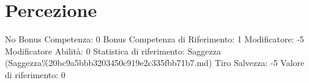 \section{Percezione}\label{percezione}

\begin{description}
\tightlist
\item[Tags: ABI]
No Bonus Competenza: 0 Bonus Competenza di Riferimento: 1 Modificatore:
-5 Modificatore Abilità: 0 Statistica di riferimento: Saggezza
(Saggezza\%20bc9a5bbb3203450c919e2c335fbb71b7.md) Tiro Salvezza: -5
Valore di riferimento: 0
\end{description}

